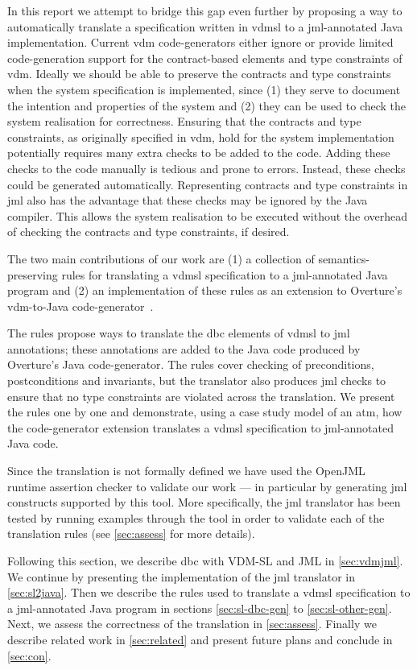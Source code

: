 In this report we attempt to bridge this gap even further by proposing
a way to automatically translate a specification written in \ac{vdmsl}
to a \ac{jml}-annotated Java implementation. Current \ac{vdm}
code-generators either ignore or provide limited code-generation
support for the contract-based elements and type constraints of
\ac{vdm}. Ideally we should be able to preserve the contracts and type
constraints when the system specification is implemented, since (1)
they serve to document the intention and properties of the system and
(2) they can be used to check the system realisation for
correctness. Ensuring that the contracts and type constraints, as
originally specified in \ac{vdm}, hold for the system implementation
potentially requires many extra checks to be added to the code. Adding
these checks to the code manually is tedious and prone to
errors. Instead, these checks could be generated
automatically. Representing contracts and type constraints in \ac{jml}
also has the advantage that these checks may be ignored by the Java
compiler. This allows the system realisation to be executed without
the overhead of checking the contracts and type constraints, if
desired.

The two main contributions of our work are (1) a collection of
semantics-preserving rules for translating a \ac{vdmsl} specification
to a \ac{jml}-annotated Java program and (2) an implementation of
these rules as an extension to Overture's \cite{Larsen&10a,Overture}
\ac{vdm}-to-Java code-generator~\cite{Jorgensen&14a}.

The rules propose ways to translate the \ac{dbc} elements of
\ac{vdmsl} to \ac{jml} annotations; these annotations are added to the
Java code produced by Overture's Java code-generator. The rules cover
checking of preconditions, postconditions and invariants, but the
translator also produces \ac{jml} checks to ensure that no type
constraints are violated across the translation. We present the rules
one by one and demonstrate, using a case study model of an \ac{atm},
how the code-generator extension translates a \ac{vdmsl} specification
to \ac{jml}-annotated Java code.

Since the translation is not formally defined we have used the
OpenJML~\cite{Cok&11} runtime assertion checker to validate our work
--- in particular by generating \ac{jml} constructs supported by this
tool. More specifically, the \ac{jml} translator has been tested by
running examples through the tool in order to validate each of the
translation rules (see \autoref{sec:assess} for more details).

Following this section, we describe \ac{dbc} with VDM-SL and JML in
\autoref{sec:vdmjml}. We continue by presenting the implementation of
the \ac{jml} translator in \autoref{sec:sl2java}. Then we describe the
rules used to translate a \ac{vdmsl} specification to a
\ac{jml}-annotated Java program in sections \ref{sec:sl-dbc-gen} to
\ref{sec:sl-other-gen}. Next, we assess the correctness of the
translation in \autoref{sec:assess}. Finally we describe related work
in \autoref{sec:related} and present future plans and conclude in
\autoref{sec:con}.



